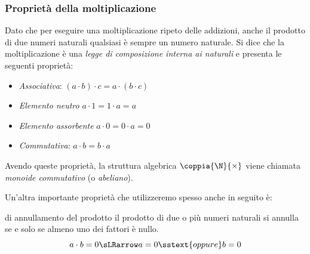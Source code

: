 \subsubsection{Proprietà della moltiplicazione}

Dato che per eseguire una moltiplicazione ripeto delle addizioni, 
anche il prodotto di due numeri  naturali qualsiasi è sempre un numero 
naturale. 
Si dice che la moltiplicazione è una \emph{legge di composizione interna ai
naturali} e presenta le seguenti proprietà:

\begin{itemize} [noitemsep]
 \item \emph{Associativa}: \((a \cdot b) \cdot c = a \cdot (b \cdot c)\)
 \item \emph{Elemento neutro} \(a \cdot 1 = 1 \cdot a = a\)
 \item \emph{Elemento assorbente} \(a \cdot 0 = 0 \cdot a = 0\)
 \item \emph{Commutativa}: \(a \cdot b = b \cdot a\)
\end{itemize}

Avendo queste proprietà, la struttura algebrica \(\coppia{\N}{\times}\) 
viene chiamata \emph{monoide commutativo} (o \emph{abeliano}).


\bigskip %
Un'altra importante proprietà che utilizzeremo spesso anche in seguito è:

\begin{principio}{di annullamento del prodotto}{}
il prodotto di due o più numeri naturali si annulla se e solo se almeno uno 
dei fattori è nullo.
\[ a \cdot b = 0 \sLRarrow a=0 \sstext{oppure} b = 0\]
\end{principio}


